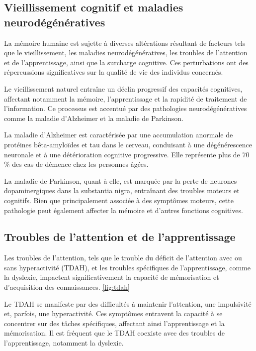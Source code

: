 \documentclass[12pt,a4paper]{report}
\begin{document}
\subsection{Vieillissement cognitif et maladies neurodégénératives}

La mémoire humaine est sujette à diverses altérations résultant de facteurs tels que le vieillissement, les maladies neurodégénératives, les troubles de l'attention et de l'apprentissage, ainsi que la surcharge cognitive. Ces perturbations ont des répercussions significatives sur la qualité de vie des individus concernés.

Le vieillissement naturel entraîne un déclin progressif des capacités cognitives, affectant notamment la mémoire, l'apprentissage et la rapidité de traitement de l'information. Ce processus est accentué par des pathologies neurodégénératives comme la maladie d'Alzheimer et la maladie de Parkinson.

La maladie d'Alzheimer est caractérisée par une accumulation anormale de protéines bêta-amyloïdes et tau dans le cerveau, conduisant à une dégénérescence neuronale et à une détérioration cognitive progressive.\cite{dr_calon} Elle représente plus de 70 \% des cas de démence chez les personnes âgées.\cite{ess_autonomie}

La maladie de Parkinson, quant à elle, est marquée par la perte de neurones dopaminergiques dans la substantia nigra, entraînant des troubles moteurs et cognitifs. Bien que principalement associée à des symptômes moteurs, cette pathologie peut également affecter la mémoire et d'autres fonctions cognitives.

\newpage

\subsection{Troubles de l'attention et de l'apprentissage}

Les troubles de l'attention, tels que le trouble du déficit de l'attention avec ou sans hyperactivité (TDAH), et les troubles spécifiques de l'apprentissage, comme la dyslexie, impactent significativement la capacité de mémorisation et d'acquisition des connaissances. \ref{fig:tdah}

Le TDAH se manifeste par des difficultés à maintenir l'attention, une impulsivité et, parfois, une hyperactivité. Ces symptômes entravent la capacité à se concentrer sur des tâches spécifiques, affectant ainsi l'apprentissage et la mémorisation. Il est fréquent que le TDAH coexiste avec des troubles de l'apprentissage, notamment la dyslexie. \cite{dyscoaching}
\end{document}

